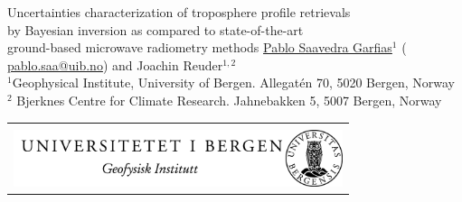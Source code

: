 \documentclass[landscape,paperwidth=1189mm,paperheight=841mm,fontscale=0.4,margin=.7cm]{baposter}
\begin{document}
\begin{poster}
{\begin{tabular}{c}
    \end{tabular}   
  }
  {\color{white} Uncertainties characterization of troposphere profile retrievals\\ by Bayesian inversion as compared to state-of-the-art\\ ground-based microwave radiometry methods\vspace{0.5em}}
  {\underline{Pablo Saavedra Garfias}$^1$ ({\color{blue} \url{pablo.saa@uib.no}})
    and Joachin Reuder$^{1,2}$\\
    $^1$Geophysical Institute, University of Bergen. Allegat{\'e}n 70, 5020 Bergen, Norway\\
	$^2$ Bjerknes Centre for Climate Research. Jahnebakken 5, 5007 Bergen, Norway\\
    }
  {%
    \begin{tabular}{r}
   		\vspace{+10em}\\
      \includegraphics[height=4.5em]{UiBlogo_gray_h.png}
    \end{tabular}   
  }

    \newcommand{\colouredcircle}{%
      \tikz{\useasboundingbox (-0.2em,-0.32em) rectangle(0.2em,0.32em); \draw[draw=black,fill=lightblue,line width=0.03em] (0,0) circle(0.28em);}}

\end{poster}
\end{document}
